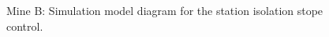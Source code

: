 \begin{appendices}
	\begin{figure}[h]
		\centering
		\caption{Mine B: Simulation model diagram for the station isolation stope control.}
		\label{fig: Stope layout}
	\end{figure}

\end{appendices}
